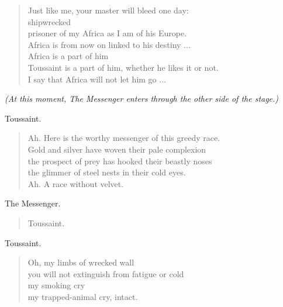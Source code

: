 \documentclass[letterpaper,article,12pt,oneside,notitlepage]{memoir}
\begin{document}
\begin{verse}
Just like me, your master will bleed one day: \\
shipwrecked \\
prisoner of my Africa as I am of his Europe. \\
Africa is from now on linked to his destiny ... \\
Africa is a part of him \\
Toussaint is a part of him, whether he likes it or not. \\
I say that Africa will not let him go ... \\
\end{verse}

\textit{(At this moment, The Messenger enters through the other side of the stage.)}

\begin{center}Toussaint.\end{center}

\begin{verse}
Ah. Here is the worthy messenger of this greedy race. \\
Gold and silver have woven their pale complexion \\
the prospect of prey has hooked their beastly noses \\
the glimmer of steel nests in their cold eyes. \\
Ah. A race without velvet. \\
\end{verse}

\begin{center}The Messenger.\end{center}

\begin{verse}
Toussaint. \\
\end{verse}

\begin{center}Toussaint.\end{center}

\begin{verse}
Oh, my limbs of wrecked wall \\
you will not extinguish from fatigue or cold \\
my smoking cry \\
my trapped-animal cry, intact. \\
\end{verse}

\clearpage
\end{document}
